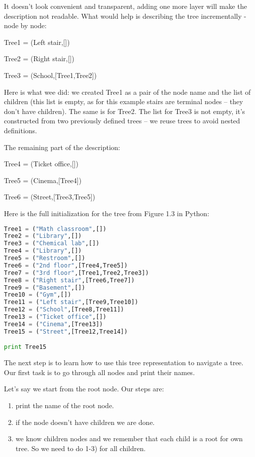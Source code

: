 It doesn't look convenient and transparent, adding one more layer
will make the description not readable. 
What would help is describing the tree incrementally - node by node:

Tree1 = (Left stair,[])

Tree2 = (Right stair,[]) 

Tree3 = (School,[Tree1,Tree2])

Here is what wee did: we created Tree1 as a pair of the node
name and the list of children (this list is empty, as for this example
stairs are terminal nodes -- they don't have children). 
The same is for Tree2. The list for Tree3 is not empty, it's constructed
from two previously defined trees -- we reuse trees to avoid
nested definitions. 

The remaining part of the description:

Tree4 = (Ticket office,[])

Tree5 = (Cinema,[Tree4])

Tree6 = (Street,[Tree3,Tree5])


Here is the full initialization for the tree from Figure 1.3 in Python:

\begin{lstlisting}[style=codelst,language=Python,caption={Python: tree description}]
Tree1 = ("Math classroom",[])
Tree2 = ("Library",[])
Tree3 = ("Chemical lab",[])
Tree4 = ("Library",[])
Tree5 = ("Restroom",[])
Tree6 = ("2nd floor",[Tree4,Tree5])
Tree7 = ("3rd floor",[Tree1,Tree2,Tree3])
Tree8 = ("Right stair",[Tree6,Tree7])
Tree9 = ("Basement",[])
Tree10 = ("Gym",[])
Tree11 = ("Left stair",[Tree9,Tree10])
Tree12 = ("School",[Tree8,Tree11])
Tree13 = ("Ticket office",[])
Tree14 = ("Cinema",[Tree13])
Tree15 = ("Street",[Tree12,Tree14])

print Tree15
\end{lstlisting}

The next step is to learn how to use this tree representation to navigate
a tree. Our first task is to go through all nodes and print their names.

Let's say we start from the root node. Our steps are:

\begin{leftborder}
\begin{enumerate}
\item print the name of the root node.
\item if the node doesn't have children we are done.
\item we know children nodes and we remember that each child is a root for own tree.
So we need to do 1-3) for all children.
\end{enumerate}
\end{leftborder}

